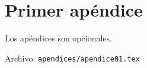 
\chapter{Primer apéndice}\label{ap:apendice1}

Los apéndices son opcionales.

Archivo: \texttt{apendices/apendice01.tex}

\endinput
